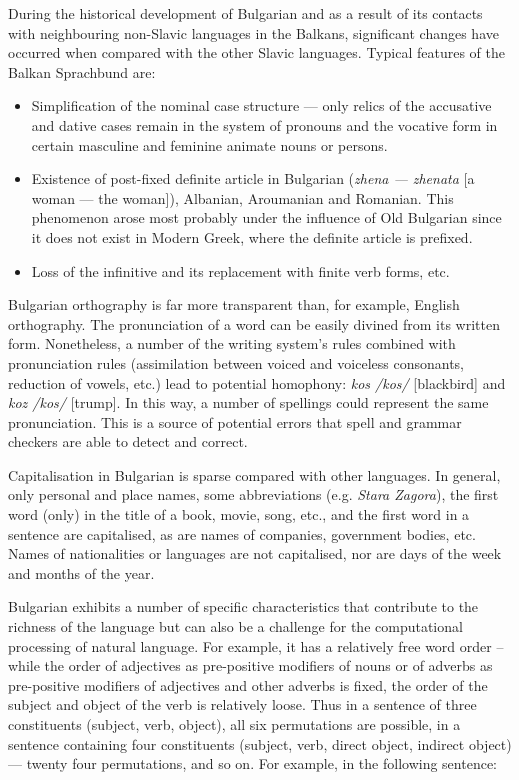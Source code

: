 \begin{multicols}{2}
During the historical development of Bulgarian and as a result of its contacts with neighbouring non-Slavic languages in the Balkans, significant changes have occurred when compared with the other Slavic languages. Typical features of the Balkan Sprachbund are:
\begin{itemize}
\item Simplification of the nominal case structure — only relics of the accusative and dative cases remain in the system of pronouns and the vocative form in certain masculine and feminine animate nouns or persons.

\item Existence of post-fixed definite article in Bulgarian (\textit{{zhena — zhenata}} [a woman — the woman]), Albanian, Aroumanian and Romanian. This phenomenon arose most probably under the influence of Old Bulgarian since it does not exist in Modern Greek, where the definite article is prefixed.

\item Loss of the infinitive and its replacement with finite verb forms, etc. 
\end{itemize}

Bulgarian orthography is far more transparent than, for example, English orthography. The pronunciation of a word can be easily divined from its written form. Nonetheless, a number of the writing system's rules combined with pronunciation rules (assimilation between voiced and voiceless consonants, reduction of vowels, etc.) lead to potential homophony: \textit{{kos} /kos/} [blackbird] and \textit{{koz /kos/}} [trump]. In this way, a number of spellings could represent the same pronunciation. This is a source of potential errors that spell and grammar checkers are able to detect and correct.

Capitalisation in Bulgarian is sparse compared with other languages. In general, only personal and place names, some abbreviations (e.g. \textit{Stara Zagora}), the first word (only) in the title of a book, movie, song, etc., and the first word in a sentence are capitalised, as are names of companies, government bodies, etc. Names of nationalities or languages are not capitalised, nor are days of the week and months of the year.
 
Bulgarian exhibits a number of specific characteristics that contribute to the richness of the language but can also be a challenge for the computational processing of natural language. For example, it has a relatively free word order – while the order of adjectives as pre-positive modifiers of nouns or of adverbs as pre-positive modifiers of adjectives and other adverbs is fixed, the order of the subject and object of the verb is relatively loose. Thus in a sentence of three constituents (subject, verb, object), all six permutations are possible, in a sentence containing four constituents (subject, verb, direct object, indirect object) — twenty four permutations, and so on. For example, in the following sentence:


\end{multicols}
